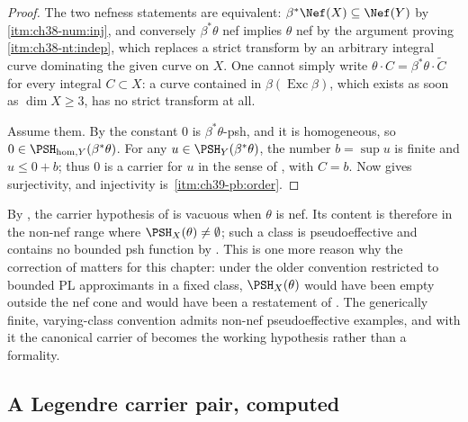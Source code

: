 \begin{proof}
The two nefness statements are equivalent: $\beta^*\Nef(X)\subseteq\Nef(Y)$
by \,\cref{itm:ch38-num:inj}, and
conversely $\beta^*\theta$ nef implies $\theta$ nef by the argument
proving \,\cref{itm:ch38-nt:indep}, which
replaces a strict transform by an arbitrary integral curve dominating the
given curve on $X$.  One cannot simply write
$\theta\cdot C=\beta^*\theta\cdot\widetilde C$ for every integral
$C\subset X$: a curve contained in $\beta(\operatorname{Exc}\beta)$, which
exists as soon as $\dim X\geq3$, has no strict transform at all.

Assume them.  By  the constant $0$ is
$\beta^*\theta$-psh, and it is homogeneous, so
$0\in\PSH_{\mathrm{hom},Y}(\beta^*\theta)$.  For any
$u\in\PSH_Y(\beta^*\theta)$, the number $b=\sup u$ is finite and
$u\le0+b$; thus $0$ is a carrier for $u$ in the sense of
, with $C=b$.  Now
 gives surjectivity, and injectivity is
\,\cref{itm:ch39-pb:order}.
\end{proof}

\begin{remark}
\label{rem:ch39-carrier-bites}
By , the carrier hypothesis of
 is vacuous when $\theta$ is nef.  Its
content is therefore in the non-nef range where
$\PSH_X(\theta)\ne\emptyset$; such a class is pseudoeffective and contains
no bounded psh function by .  This is one more reason
why the correction of  matters for this chapter: under the
older convention restricted to bounded PL approximants in a fixed class,
$\PSH_X(\theta)$ would have been empty outside the nef cone and
 would have been a restatement of
.  The generically finite, varying-class
convention admits non-nef pseudoeffective examples, and with it the
canonical carrier of  becomes the working hypothesis
rather than a formality.
\end{remark}

\subsection{A Legendre carrier pair, computed}
\label{sec:ch39-carrier-example}

